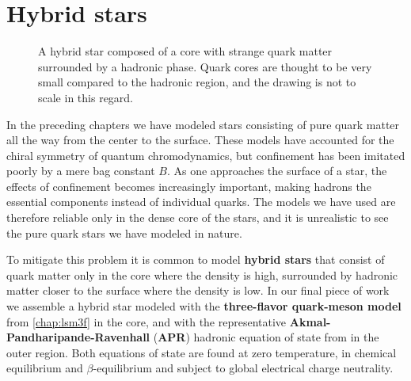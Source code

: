 \chapter{Hybrid stars}
\label{chap:hybrid}

\begin{figure}[th!]
\centering
{}
\caption{\label{fig:hybrid:illustration}%
	A hybrid star composed of a core with strange quark matter surrounded by a hadronic phase.
	Quark cores are thought to be very small compared to the hadronic region, and the drawing is not to scale in this regard.
}
\end{figure}

In the preceding chapters we have modeled stars consisting of pure quark matter all the way from the center to the surface.
These models have accounted for the chiral symmetry of quantum chromodynamics,
but confinement has been imitated poorly by a mere bag constant $B$.
As one approaches the surface of a star,
the effects of confinement becomes increasingly important,
making hadrons the essential components instead of individual quarks.
The models we have used are therefore reliable only in the dense core of the stars,
and it is unrealistic to see the pure quark stars we have modeled in nature.

To mitigate this problem it is common to model \textbf{hybrid stars} that consist of
quark matter only in the core where the density is high, 
surrounded by hadronic matter closer to the surface where the density is low.
In our final piece of work
we assemble a hybrid star modeled with the \textbf{three-flavor quark-meson model} from \cref{chap:lsm3f} in the core,
and with the representative \textbf{Akmal-Pandharipande-Ravenhall} (\textbf{APR}) hadronic equation of state from \cite{ref:apr} in the outer region.
Both equations of state are found at zero temperature, in chemical equilibrium and $\beta$-equilibrium and subject to global electrical charge neutrality.

